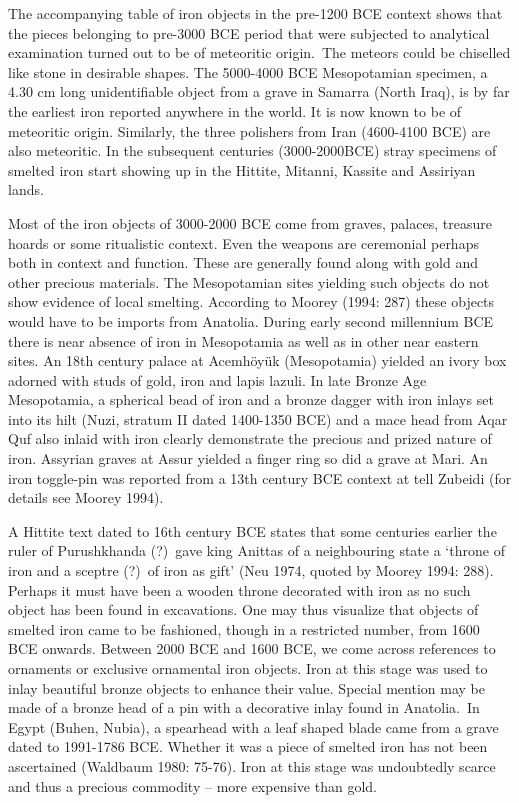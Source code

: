 {The accompanying table of iron objects in the pre-1200 BCE context shows that the pieces belonging to pre-3000 BCE period that were subjected to analytical examination turned out to be of meteoritic origin.~The meteors could be chiselled like stone in desirable shapes. The 5000-4000 BCE Mesopotamian specimen, a 4.30 cm long unidentifiable object from a grave in Samarra (North Iraq), is by far the earliest iron reported anywhere in the world. It is now known to be of meteoritic origin. Similarly, the three polishers from Iran (4600-4100 BCE) are also meteoritic. In the subsequent centuries (3000-2000\newpage  BCE) stray specimens of smelted iron start showing up in the Hittite, Mitanni, Kassite and Assiriyan lands.

Most of the iron objects of 3000-2000 BCE come from graves, palaces, treasure hoards or some ritualistic context. Even the weapons are ceremonial perhaps both in context and function. These are generally found along with gold and other precious materials. The Mesopotamian sites yielding such objects do not show evidence of local smelting. According to Moorey (1994: 287) these objects would have to be imports from Anatolia. During early second millennium BCE there is near absence of iron in Mesopotamia as well as in other near eastern sites. An 18th century palace at Acemhöyük (Mesopotamia) yielded an ivory box adorned with studs of gold, iron and lapis lazuli. In late Bronze Age Mesopotamia, a spherical bead of iron and a bronze dagger with iron inlays set into its hilt (Nuzi, stratum II dated 1400-1350 BCE) and a mace head from Aqar Quf also inlaid with iron clearly demonstrate the precious and prized nature of iron. Assyrian graves at Assur yielded a finger ring so did a grave at Mari. An iron toggle-pin was reported from a 13th century BCE context at tell Zubeidi (for details see Moorey 1994).

A Hittite text dated to 16th century BCE states that some centuries earlier the ruler of Purushkhanda (?)~gave king Anittas of a neighbouring state a `throne of iron and a sceptre (?)~of iron as gift' (Neu 1974, quoted by Moorey 1994: 288). Perhaps it must have been a wooden throne decorated with iron as no such object has been found in excavations. One may thus visualize that objects of smelted iron came to be fashioned, though in a restricted number, from 1600 BCE onwards. Between 2000 BCE and 1600 BCE, we come across references to ornaments or exclusive ornamental iron objects. Iron at this stage was used to inlay beautiful bronze objects to enhance their value. Special mention may be made of a bronze head of a pin with a decorative inlay found in Anatolia.~In Egypt (Buhen, Nubia), a spearhead with a leaf shaped blade came from a grave dated to 1991-1786 BCE. Whether it was a piece of smelted iron has not been ascertained (Waldbaum 1980: 75-76). Iron at this stage was undoubtedly scarce and thus a precious commodity – more expensive than gold. 

}
